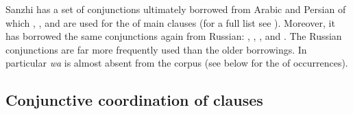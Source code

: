 Sanzhi has a set of conjunctions ultimately borrowed from Arabic and Persian of which  ,  , and   are used for the  of main clauses (for a full list see ). Moreover, it has borrowed the same conjunctions again from Russian:  ,  ,  , and  . The Russian conjunctions are far more frequently used than the older borrowings. In particular \textit{wa} is almost absent from the corpus (see below for the  of occurrences).



\subsection{Conjunctive coordination of clauses}
\label{ssec:Conjunctive coordination of clauses}

